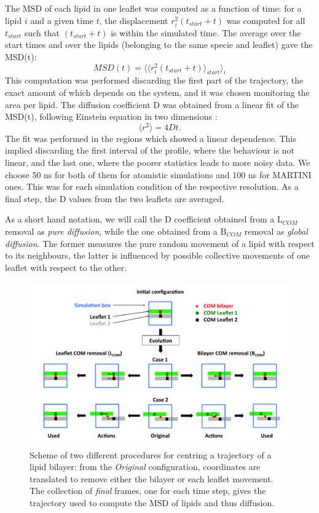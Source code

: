 \begin{itemize}
The MSD of each lipid in one leaflet was computed as a function of time: for a lipid $i$ and a given time $t$, the displacement $r_i^2(t_{start}+t)$ was computed for all $t_{start}$ such that $(t_{start}+t)$ is within the simulated time. The average over the start times and over the lipids (belonging to the same specie and leaflet) gave the MSD(t):
\begin{equation}
MSD(t) = \langle \langle r_i^2(t_{start}+t) \rangle_{start} \rangle_i
\end{equation}
This computation was performed discarding the first part of the trajectory, the exact amount of which depends on the system, and it was chosen monitoring the area per lipid.
The diffusion coefficient D was obtained from a linear fit of the MSD(t), following Einstein equation in two dimensions \citep{Einstein1956}:
\begin{equation}
\langle r^2 \rangle = 4Dt.
\end{equation}
The fit was performed in the regions which showed a linear dependence. This implied discarding the first interval of the profile, where the behaviour is not linear, and the last one, where the poorer statistics leads to more noisy data. We choose 50 ns for both of them for atomistic simulations and 100 ns for MARTINI ones. This was for each simulation condition of the respective resolution. As a final step, the D values from the two leaflets are averaged.

As a short hand notation, we will call the D coefficient obtained from a L$_{COM}$ removal as \emph{pure diffusion}, while the one obtained from a B$_{COM}$ removal as \emph{global diffusion}.
%
The former measures the pure random movement of a lipid with respect to its neighbours, the latter is influenced by possible collective movements of one leaflet with respect to the other.
\begin{figure}[t!]
\centering
\includegraphics[width=0.75\linewidth]{3results_capsule/pics/diff_comrem} 
\caption[Scheme of trajectories preprocessing for computation of diffusion]{Scheme of two different procedures for centring a trajectory of a lipid bilayer: from the \emph{Original} configuration, coordinates are translated to remove either the bilayer or each leaflet movement. The collection of \emph{final} frames, one for each time step, gives the trajectory used to compute the MSD of lipids and thus diffusion.}
\label{fig:com_rem_scheme}
\end{figure}
\end{itemize}

